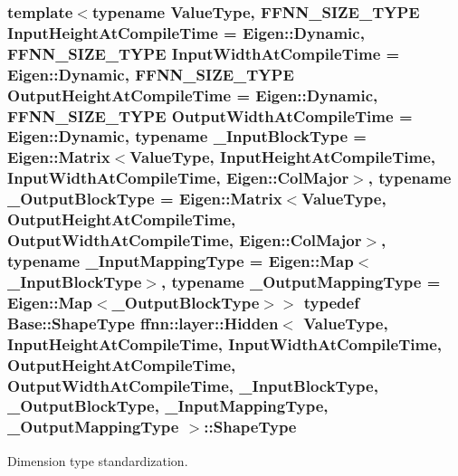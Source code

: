 \hypertarget{classffnn_1_1layer_1_1_hidden_a7ed1a797fcb7bfb43d66c0eb24967882}{
\subsubsection[{Shape\-Type}]{\setlength{\rightskip}{0pt plus 5cm}template$<$typename Value\-Type, F\-F\-N\-N\-\_\-\-S\-I\-Z\-E\-\_\-\-T\-Y\-P\-E Input\-Height\-At\-Compile\-Time = Eigen\-::\-Dynamic, F\-F\-N\-N\-\_\-\-S\-I\-Z\-E\-\_\-\-T\-Y\-P\-E Input\-Width\-At\-Compile\-Time = Eigen\-::\-Dynamic, F\-F\-N\-N\-\_\-\-S\-I\-Z\-E\-\_\-\-T\-Y\-P\-E Output\-Height\-At\-Compile\-Time = Eigen\-::\-Dynamic, F\-F\-N\-N\-\_\-\-S\-I\-Z\-E\-\_\-\-T\-Y\-P\-E Output\-Width\-At\-Compile\-Time = Eigen\-::\-Dynamic, typename \-\_\-\-Input\-Block\-Type = Eigen\-::\-Matrix$<$\-Value\-Type, Input\-Height\-At\-Compile\-Time, Input\-Width\-At\-Compile\-Time, Eigen\-::\-Col\-Major$>$, typename \-\_\-\-Output\-Block\-Type = Eigen\-::\-Matrix$<$\-Value\-Type, Output\-Height\-At\-Compile\-Time, Output\-Width\-At\-Compile\-Time, Eigen\-::\-Col\-Major$>$, typename \-\_\-\-Input\-Mapping\-Type = Eigen\-::\-Map$<$\-\_\-\-Input\-Block\-Type$>$, typename \-\_\-\-Output\-Mapping\-Type = Eigen\-::\-Map$<$\-\_\-\-Output\-Block\-Type$>$$>$ typedef {\bf Base\-::\-Shape\-Type} {\bf ffnn\-::layer\-::\-Hidden}$<$ Value\-Type, Input\-Height\-At\-Compile\-Time, Input\-Width\-At\-Compile\-Time, Output\-Height\-At\-Compile\-Time, Output\-Width\-At\-Compile\-Time, \-\_\-\-Input\-Block\-Type, \-\_\-\-Output\-Block\-Type, \-\_\-\-Input\-Mapping\-Type, \-\_\-\-Output\-Mapping\-Type $>$\-::{\bf Shape\-Type}}}\label{classffnn_1_1layer_1_1_hidden_a7ed1a797fcb7bfb43d66c0eb24967882}


Dimension type standardization. 

